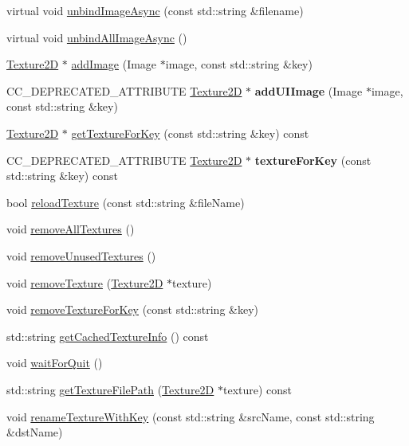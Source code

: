 \begin{DoxyCompactItemize}
\item 
virtual void \hyperlink{classTextureCache_a02c48302097f8109e604b64018267046}{unbind\+Image\+Async} (const std\+::string \&filename)
\item 
virtual void \hyperlink{classTextureCache_a8cd53b2493af00f76d7e24a19dc2555d}{unbind\+All\+Image\+Async} ()
\item 
\hyperlink{classTexture2D}{Texture2D} $\ast$ \hyperlink{classTextureCache_a6215487085c4f04c22bc03d6bce95fbe}{add\+Image} (Image $\ast$image, const std\+::string \&key)
\item 
\mbox{\label{classTextureCache_afbe2231b715b485a544ff9c872e6b540}} 
C\+C\+\_\+\+D\+E\+P\+R\+E\+C\+A\+T\+E\+D\+\_\+\+A\+T\+T\+R\+I\+B\+U\+TE \hyperlink{classTexture2D}{Texture2D} $\ast$ {\bfseries add\+U\+I\+Image} (Image $\ast$image, const std\+::string \&key)
\item 
\hyperlink{classTexture2D}{Texture2D} $\ast$ \hyperlink{classTextureCache_adb72cb7ee095134531ea8bd03588db94}{get\+Texture\+For\+Key} (const std\+::string \&key) const
\item 
\mbox{\label{classTextureCache_a42a1e21cee57d60f7c1268e36470e361}} 
C\+C\+\_\+\+D\+E\+P\+R\+E\+C\+A\+T\+E\+D\+\_\+\+A\+T\+T\+R\+I\+B\+U\+TE \hyperlink{classTexture2D}{Texture2D} $\ast$ {\bfseries texture\+For\+Key} (const std\+::string \&key) const
\item 
bool \hyperlink{classTextureCache_a6063d9bceafa8a6f60c498f8e2c15b4a}{reload\+Texture} (const std\+::string \&file\+Name)
\item 
void \hyperlink{classTextureCache_a860e0ed7bd403b85e91cec4b03057d61}{remove\+All\+Textures} ()
\item 
void \hyperlink{classTextureCache_acbec791c5421295c030e097716787f68}{remove\+Unused\+Textures} ()
\item 
void \hyperlink{classTextureCache_a346fc925fda0b7964bbb57f100275760}{remove\+Texture} (\hyperlink{classTexture2D}{Texture2D} $\ast$texture)
\item 
void \hyperlink{classTextureCache_ad532b26bf9a162d34710aa38f776c134}{remove\+Texture\+For\+Key} (const std\+::string \&key)
\item 
std\+::string \hyperlink{classTextureCache_ab0aaf8d7d614ba1d5dcfac8ed7e1c4b2}{get\+Cached\+Texture\+Info} () const
\item 
void \hyperlink{classTextureCache_ae51af522306e9449d772c3996509a509}{wait\+For\+Quit} ()
\item 
std\+::string \hyperlink{classTextureCache_a4dd4a314af856fd66bb10b53a61fd0ea}{get\+Texture\+File\+Path} (\hyperlink{classTexture2D}{Texture2D} $\ast$texture) const
\item 
void \hyperlink{classTextureCache_a8735ea61a274834e6b3db7165ce2c26d}{rename\+Texture\+With\+Key} (const std\+::string \&src\+Name, const std\+::string \&dst\+Name)
\end{DoxyCompactItemize}
